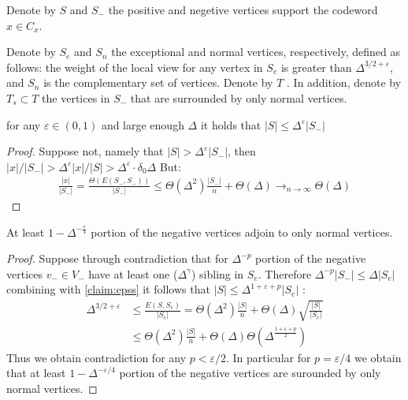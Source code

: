 Denote by $S$ and $S_{-}$ the positive and negetive vertices support the codeword $x \in C_{x}$.
\begin{definition}
Denote by $S_e$ and $S_n$ the exceptional and normal vertices, respectively, defined as follows: the weight of the local view for any vertex in $S_e$ is greater than $\Delta^{3/2 + \varepsilon}$, and $S_n$ is the complementary set of vertices. Denote by $T$ . In addition, denote by $T_s \subset T$ the vertices in $S_-$ that are surrounded by only normal vertices.
\end{definition}
\begin{claim}
  \label{claim:epss}
  for any $\varepsilon \in \left( 0,1 \right)$ and large enough $\Delta$  it holds that $ |S| \le \Delta^{\varepsilon}|S_{-}| $ 
\end{claim}
\begin{proof}
  Suppose not, namely that $|S| > \Delta^{\varepsilon}|S_{-}|$, then $|x|/|S_{-}| > \Delta^{\varepsilon}|x|/|S| > \Delta^{\varepsilon} \cdot \delta_{0}\Delta $ But:  
\begin{equation*}
  \begin{split}
    \frac{|x|}{|S_{-}|} = \frac{\Theta \left(E(S_{-},S_{-}) \right)}{|S_{-}|} \le \Theta(\Delta^{2})\frac{|S_{-}|}{n}  + \Theta(\Delta)  \rightarrow_{n\rightarrow \infty} \Theta(\Delta)
  \end{split}
\end{equation*}
\end{proof}

\begin{claim}
  \label{claim:portion}
  At least $ 1- \Delta^{-\frac{\varepsilon}{4}}$ portion of the negative vertices adjoin to only normal vertices. 
\end{claim}
\begin{proof}
  Suppose through contradiction that for $\Delta^{-p}$ portion of the negative vertices $v_{-}\in V_{-}$ have at least one ($\Delta^{\gamma}$) sibling in $S_{e}$. Therefore $ \Delta^{-p} |S_{-}| \le \Delta |S_{e}|$ combining with \cref{claim:epss} it follows that $|S| \le \Delta^{1+\varepsilon + p }|S_{e}|$ : 
  \begin{equation*}
    \begin{split}
      \Delta^{3/2 + \varepsilon} & \le \frac{E(S,S_{e})}{|S_{e}|} = \Theta\left( \Delta^{2} \right)\frac{|S|}{n} + \Theta\left( \Delta \right)\sqrt{ \frac{|S|}{|S_{e}|}  }\\ 
      & \le \Theta(\Delta^{2}) \frac{|S|}{n} + \Theta(\Delta) \Theta\left( \Delta^{\frac{1+\varepsilon + p}{2}} \right)  
    \end{split}
  \end{equation*} 
  Thus we obtain contradiction for any $p < \varepsilon/2$. In particular for $p = \varepsilon/4$ we obtain that at least $1 - \Delta^{-\varepsilon/4}$ portion of the negative vertices are surounded by only normal vertices. 
 \end{proof}

